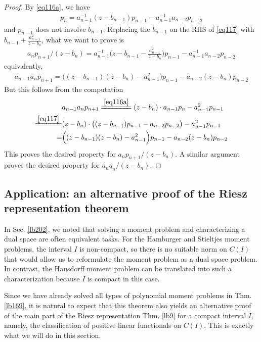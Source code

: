 \documentclass[12pt,b5paper,notitlepage]{article}
\theoremstyle{definition}
\theoremstyle{plain}
\numberwithin{equation}{section}
\begin{document}
\begin{proof}
By \eqref{eq116a}, we have
\begin{align}\label{eq117}
p_n=a_{n-1}^{-1}(z-b_{n-1})p_{n-1}-a_{n-1}^{-1}a_{n-2}p_{n-2}
\end{align}
and $p_{n-1}$ does not involve $b_{n-1}$. Replacing the $b_{n-1}$ on the RHS of \eqref{eq117} with $b_{n-1}+\frac{a_{n-1}^2}{z-b_n}$, what we want to prove is
\begin{align*}
a_np_{n+1}/(z-b_n)=a_{n-1}^{-1}\Big(z-b_{n-1}-\frac{a_{n-1}^2}{z-b_n}\Big)p_{n-1}-a_{n-1}^{-1}a_{n-2}p_{n-2}
\end{align*}
equivalently,
\begin{align*}
a_{n-1}a_np_{n+1}=\Big((z-b_{n-1})(z-b_n)-a_{n-1}^2\Big)p_{n-1}-a_{n-2}(z-b_n)p_{n-2}
\end{align*}
But this follows from the computation
\begin{align*}
&a_{n-1}a_np_{n+1}\xlongequal{\eqref{eq116a}}(z-b_n)\cdot a_{n-1}p_n-a_{n-1}^2p_{n-1}\\
\xlongequal{\eqref{eq117}}&(z-b_n)\cdot \big((z-b_{n-1})p_{n-1}-a_{n-2}p_{n-2}\big)-a_{n-1}^2p_{n-1}\\
=&\Big((z-b_{n-1})(z-b_n)-a_{n-1}^2\Big)p_{n-1}-a_{n-2}(z-b_n)p_{n-2}
\end{align*}
This proves the desired property for $a_np_{n+1}/(z-b_n)$. A similar argument proves the desired property for $a_nq_n/(z-b_n)$. 
\end{proof}





\subsection{Application: an alternative proof of the Riesz representation theorem}\label{lb244}


In Sec. \ref{lb202}, we noted that solving a moment problem and characterizing a dual space are often equivalent tasks. For the Hamburger and Stieltjes moment problems, the interval $I$ is non-compact, so there is no suitable norm on $C(I)$ that would allow us to reformulate the moment problem as a dual space problem. In contrast, the Hausdorff moment problem can be translated into such a characterization because $I$ is compact in this case.

Since we have already solved all types of polynomial moment problems in Thm. \ref{lb169}, it is natural to expect that this theorem also yields an alternative proof of the main part of the Riesz representation Thm. \ref{lb9} for a compact interval
$I$, namely, the classification of positive linear functionals on 
$C(I)$. This is exactly what we will do in this section.
\end{document}
